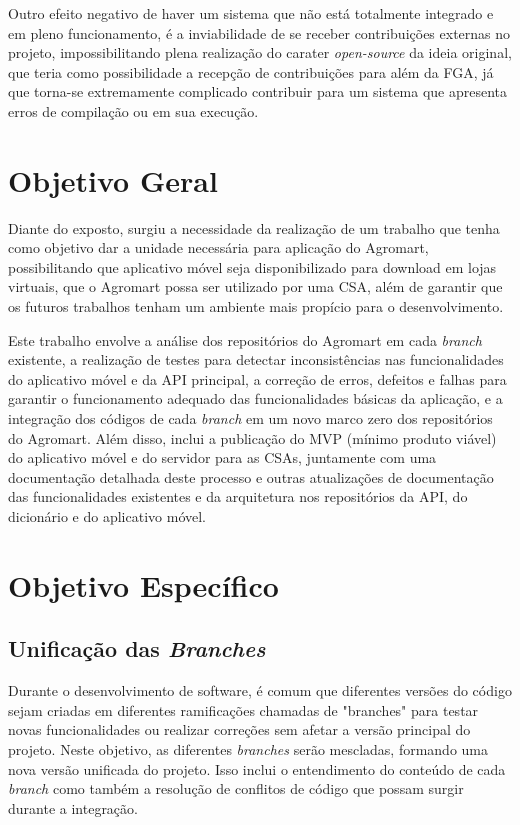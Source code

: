 Outro efeito negativo de haver um sistema que não está totalmente integrado e em pleno funcionamento, é a inviabilidade de se receber contribuições externas no projeto, impossibilitando plena realização do carater \textit{open-source} da ideia original, que teria como possibilidade a recepção de contribuições para além da FGA, já que torna-se extremamente complicado contribuir para um sistema que apresenta erros de compilação ou em sua execução.

\section{Objetivo Geral}
Diante do exposto, surgiu a necessidade da realização de um trabalho que tenha como objetivo dar a unidade necessária para aplicação do Agromart, possibilitando que aplicativo móvel seja disponibilizado para download em lojas virtuais, que o Agromart possa ser utilizado por uma CSA, além de garantir que os futuros trabalhos tenham um ambiente mais propício para o desenvolvimento.

Este trabalho envolve a análise dos repositórios do Agromart em cada \textit{branch} existente, a realização de testes para detectar inconsistências nas funcionalidades do aplicativo móvel e da API principal, a correção de erros, defeitos e falhas para garantir o funcionamento adequado das funcionalidades básicas da aplicação, e a integração dos códigos de cada \textit{branch} em um novo marco zero dos repositórios do Agromart. Além disso, inclui a publicação do MVP (mínimo produto viável) do aplicativo móvel e do servidor para as CSAs, juntamente com uma documentação detalhada deste processo e outras atualizações de documentação das funcionalidades existentes e da arquitetura nos repositórios da API, do dicionário e do aplicativo móvel.

\section{Objetivo Específico}

\subsection{Unificação das \textit{Branches}}
Durante o desenvolvimento de software, é comum que diferentes versões do código sejam criadas em diferentes ramificações chamadas de "branches" para testar novas funcionalidades ou realizar correções sem afetar a versão principal do projeto. Neste objetivo, as diferentes \textit{branches} serão mescladas, formando uma nova versão unificada do projeto. Isso inclui o entendimento do conteúdo de cada \textit{branch} como também a resolução de conflitos de código que possam surgir durante a integração.

